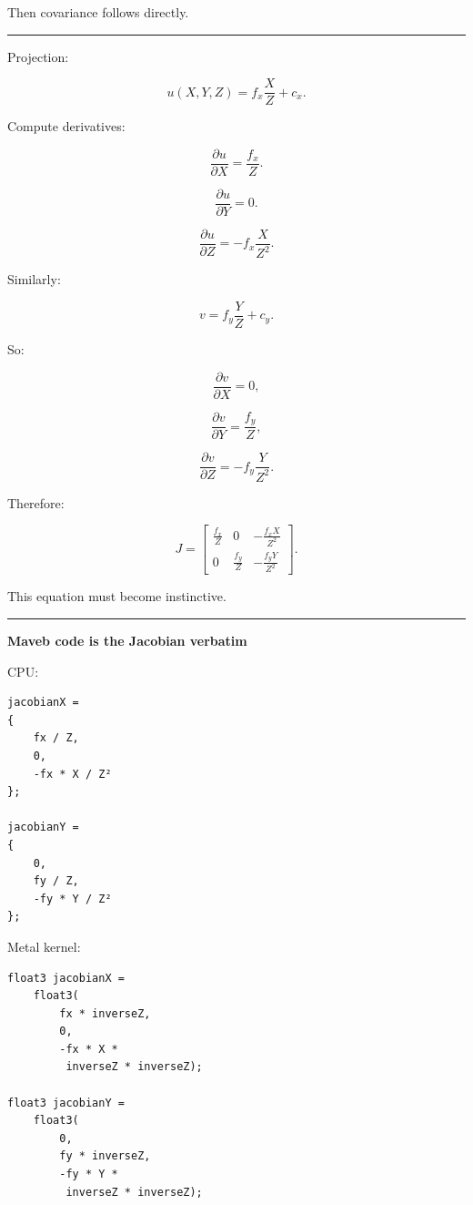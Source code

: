 Then covariance follows directly.

\begin{center}\rule{0.5\linewidth}{0.5pt}\end{center}

Projection:

\[
u(X,Y,Z)
=
f_x\frac XZ+c_x.
\]

Compute derivatives:

\[
\frac{\partial u}{\partial X}
=
\frac{f_x}{Z}.
\]

\[
\frac{\partial u}{\partial Y}
=
0.
\]

\[
\frac{\partial u}{\partial Z}
=
-f_x\frac{X}{Z^2}.
\]

Similarly:

\[
v=
f_y\frac YZ+c_y.
\]

So:

\[
\frac{\partial v}{\partial X}=0,
\]

\[
\frac{\partial v}{\partial Y}
=
\frac{f_y}{Z},
\]

\[
\frac{\partial v}{\partial Z}
=
-f_y\frac{Y}{Z^2}.
\]

Therefore:

\[
\boxed{
J=
\begin{bmatrix}
\frac{f_x}{Z}
&
0
&
-\frac{f_xX}{Z^2}
\\
0
&
\frac{f_y}{Z}
&
-\frac{f_yY}{Z^2}
\end{bmatrix}.
}
\]

This equation must become instinctive.

\begin{center}\rule{0.5\linewidth}{0.5pt}\end{center}

\textbf{Maveb code is the Jacobian verbatim}

CPU:

\begin{verbatim}
jacobianX =
{
    fx / Z,
    0,
    -fx * X / Z²
};

jacobianY =
{
    0,
    fy / Z,
    -fy * Y / Z²
};
\end{verbatim}

Metal kernel:

\begin{verbatim}
float3 jacobianX =
    float3(
        fx * inverseZ,
        0,
        -fx * X *
         inverseZ * inverseZ);

float3 jacobianY =
    float3(
        0,
        fy * inverseZ,
        -fy * Y *
         inverseZ * inverseZ);
\end{verbatim}

